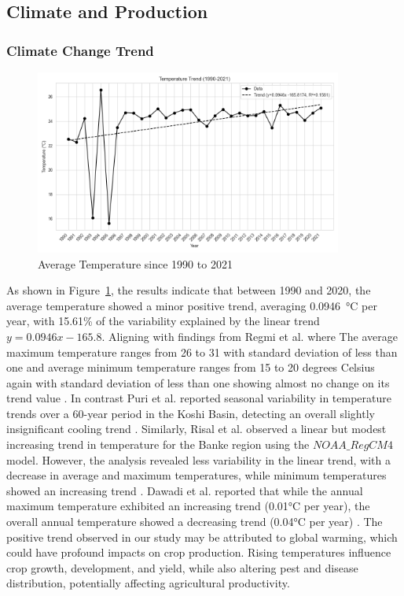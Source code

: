 \subsection{Climate and Production}

\subsubsection{Climate Change Trend}
\begin{figure}[H]
    \centering
    \caption{Average Temperature since 1990 to 2021} 
    \label{fig:trend_avg_temp}
    \includegraphics[width=0.9\textwidth]{images/trend_avg_temp.png}
\end{figure}

As shown in Figure~\ref{fig:trend_avg_temp}, the results indicate that between 1990 and 2020, the average temperature showed a minor positive trend, averaging 0.0946~°C per year, with 15.61\% of the variability explained by the linear trend \( y = 0.0946x -165.8 \). Aligning with findings from Regmi et al. where  The average maximum temperature ranges from 26 to 31 with standard deviation of less than one and average minimum temperature ranges from 15 to 20 degrees Celsius again with standard deviation of less than one showing almost no change on its trend value \citep{regmiCropYieldResponse2019}. In contrast Puri et al. reported seasonal variability in temperature trends over a 60-year period in the Koshi Basin, detecting an overall slightly insignificant cooling trend  \citep{puriSpatialTemporalVariations2024}. Similarly, Risal et al. observed a linear but modest increasing trend in temperature for the Banke region using the $NOAA\_RegCM4$ model. However, the analysis revealed less variability in the linear trend, with a decrease in average and maximum temperatures, while minimum temperatures showed an increasing trend \citep{risalImpactClimateChange2022}. Dawadi et al.  reported that while the annual maximum temperature exhibited an increasing trend (0.01°C per year), the overall annual temperature showed a decreasing trend (0.04°C per year)  \citep{dawadiImpactClimateChange2022}.
The positive trend observed in our study may be attributed to global warming, which could have profound impacts on crop production. Rising temperatures influence crop growth, development, and yield, while also altering pest and disease distribution, potentially affecting agricultural productivity.

